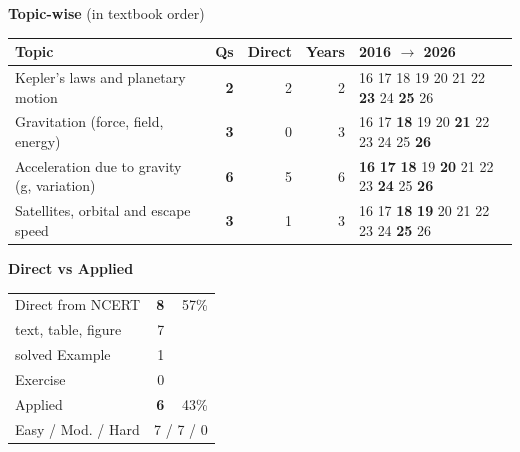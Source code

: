 {\small\textbf{\color{crimson}Topic-wise} (in textbook order)\par\smallskip
\begin{tabularx}{\linewidth}{@{}>{\raggedright\arraybackslash}Xrrrl@{}}\toprule
Topic & Qs & Direct & Years & 2016 $\rightarrow$ 2026\\\midrule
Kepler's laws and planetary motion & \textbf{2} & 2 & 2 & {\scriptsize {\color{gray!45}16} {\color{gray!45}17} {\color{gray!45}18} {\color{gray!45}19} {\color{gray!45}20} {\color{gray!45}21} {\color{gray!45}22} \textbf{23} {\color{gray!45}24} \textbf{25} {\color{gray!45}26}}\\
Gravitation (force, field, energy) & \textbf{3} & 0 & 3 & {\scriptsize {\color{gray!45}16} {\color{gray!45}17} \textbf{18} {\color{gray!45}19} {\color{gray!45}20} \textbf{21} {\color{gray!45}22} {\color{gray!45}23} {\color{gray!45}24} {\color{gray!45}25} \textbf{26}}\\
Acceleration due to gravity (g, variation) & \textbf{6} & 5 & 6 & {\scriptsize \textbf{16} \textbf{17} \textbf{18} {\color{gray!45}19} \textbf{20} {\color{gray!45}21} {\color{gray!45}22} {\color{gray!45}23} \textbf{24} {\color{gray!45}25} \textbf{26}}\\
Satellites, orbital and escape speed & \textbf{3} & 1 & 3 & {\scriptsize {\color{gray!45}16} {\color{gray!45}17} \textbf{18} \textbf{19} {\color{gray!45}20} {\color{gray!45}21} {\color{gray!45}22} {\color{gray!45}23} {\color{gray!45}24} \textbf{25} {\color{gray!45}26}}\\
\bottomrule\end{tabularx}}\par\medskip
\begin{minipage}[t]{0.34\linewidth}{\small\textbf{\color{crimson}Direct vs Applied}\par\smallskip
\begin{tabular}{@{}lrr@{}}\toprule
Direct from NCERT & \textbf{8} & 57\%\\
\quad text, table, figure & 7 &\\
\quad solved Example & 1 &\\
\quad Exercise & 0 &\\
Applied & \textbf{6} & 43\%\\\midrule
Easy / Mod. / Hard & \multicolumn{2}{r}{7 / 7 / 0}\\\bottomrule
\end{tabular}}\end{minipage}\hfill
